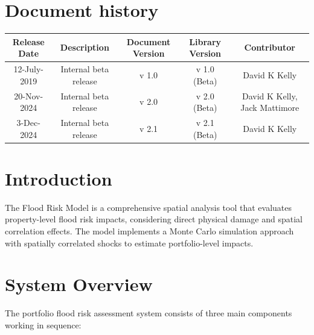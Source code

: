 \documentclass{article}
\begin{document}
\section{Document history}
\begin{table}[ht]
	\centering
	\begin{tabular}{c|c|c|c|c}
		Release Date & Description & Document Version & Library Version & Contributor\\
		\hline
		12-July-2019 & Internal beta release & v 1.0 & v 1.0 (Beta) & David K Kelly\\
		20-Nov-2024 & Internal beta release & v 2.0 & v 2.0 (Beta) & David K Kelly,  Jack Mattimore\\
		3-Dec-2024 & Internal beta release & v 2.1 & v 2.1 (Beta) & David K Kelly
	\end{tabular}
	\label{tab:revision_history}
\end{table}

\clearpage

\section{Introduction}


The Flood Risk Model is a comprehensive spatial analysis tool that evaluates property-level flood risk impacts, considering direct physical damage and spatial correlation effects. The model implements a Monte Carlo simulation approach with spatially correlated shocks to estimate portfolio-level impacts.


\section{System Overview}

The portfolio flood risk assessment system consists of three main components working in sequence:
\end{document}
